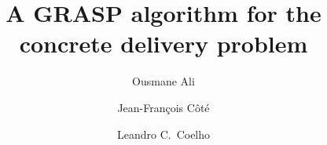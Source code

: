 \documentclass[authoryear,preprint,review,11pt]{elsarticle}
\begin{document}
\begin{frontmatter}



\title{A GRASP algorithm for the concrete delivery problem}


\author[inst1]{Ousmane Ali}


\author[inst1]{Jean-Fran\c cois C\^ot\'e}
\author[inst1,inst2]{Leandro C.~Coelho}



\end{frontmatter}
\end{document}
